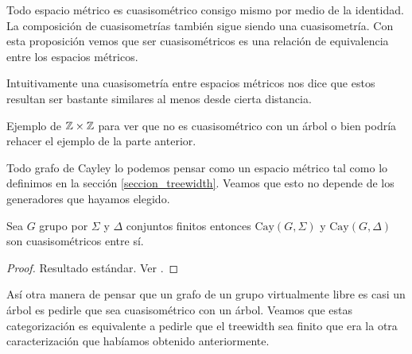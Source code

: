 \documentclass[tesis.tex]{subfiles}
\begin{document}
Todo espacio métrico es cuasisométrico consigo mismo por medio de la identidad.
La composición de cuasisometrías también sigue siendo una cuasisometría.
Con esta proposición vemos que ser cuasisométricos es una relación de equivalencia entre los espacios métricos. 


Intuitivamente una cuasisometría entre espacios métricos nos dice que estos resultan ser bastante similares al menos desde cierta distancia. 
\medskip

\begin{ej}
	Ejemplo de $\mathbb{Z} \times \mathbb{Z}$ para ver que no es cuasisométrico con un árbol o bien podría rehacer el ejemplo de la parte anterior.
\end{ej}

Todo grafo de Cayley lo podemos pensar como un espacio métrico tal como lo definimos en la sección \ref{seccion_treewidth}.  
Veamos que esto no depende de los generadores que hayamos elegido.

\begin{prop}
	Sea $G$ grupo \fg por $\Sigma$ y $\Delta$ conjuntos finitos entonces $\text{Cay}(G,\Sigma)$ y $\text{Cay}(G, \Delta)$ son cuasisométricos entre sí.
\end{prop}

\begin{proof}
	Resultado estándar. Ver \cite{bridson2013metric}.
\end{proof}



Así otra manera de pensar que un grafo de un grupo virtualmente libre es casi un árbol es pedirle que sea cuasisométrico con un árbol. 
Veamos que estas categorización es equivalente a pedirle que el treewidth sea finito que era la otra caracterización que habíamos obtenido anteriormente.
\end{document}
